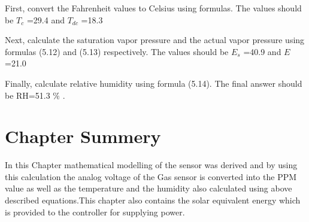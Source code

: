 First, convert the Fahrenheit values to Celsius using formulas. The values should be  \( T_{c} \) =29.4 and  \( T_{dc} \) =18.3\par

Next, calculate the saturation vapor pressure and the actual vapor pressure using formulas (5.12) and (5.13) respectively. The values should be  \( E_{s} \)  =40.9 and  \( E \)  =21.0\par

Finally, calculate relative humidity using formula (5.14). The final answer should be RH=51.3 $\%$ .\par
\section{Chapter Summery}
In this Chapter mathematical modelling of the sensor was derived and by using this calculation the analog voltage of the Gas sensor is converted into the PPM value as well as the temperature and the humidity also calculated using above described equations.This chapter also contains the solar equivalent energy which is provided to the controller for supplying power.  